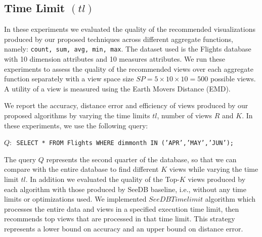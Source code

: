 \subsection{Time Limit $(tl)$}
\label{sec:results_timelimit}
%
%
%
In these experiments we evaluated the quality of the recommended visualizations produced by our proposed techniques 
 across different aggregate functions, namely: \texttt{count, sum, avg, min, max}. 
%
The dataset used is the Flights database with 10 dimension attributes and 10 measures attributes. 
%
We run these experiments to assess the quality of the recommended views over each aggregate function separately with a view space size $SP = 5 \times 10 \times 10 = 500$ possible views.
%
 A utility of a view is measured using the Earth Movers Distance (EMD).

We report the accuracy, distance error and efficiency of views produced by our proposed algorithms by varying the time limits $tl$, number of views $R$ and $K$.
%
In these experiments, we use the following query:
%
\begin{center}
\texttt{$Q:$ SELECT * FROM Flights WHERE dimmonth IN ('APR','MAY','JUN'); }
\end{center}
%
%
The query $Q$  represents the  second quarter of the database, so that we can compare with the entire database to find different $K$ views while varying the time limit $tl$. 
%
In addition we evaluated the quality of the Top-$K$ views produced by each algorithm with those produced by SeeDB baseline, i.e., without any time limits or optimizations used. 
% 
We implemented $SeeDB Timelimit$ algorithm which processes the entire data and views in a specified execution time limit, then recommends top views that are processed in that time limit.
%
This strategy represents a lower bound on accuracy and an upper bound on distance error.

